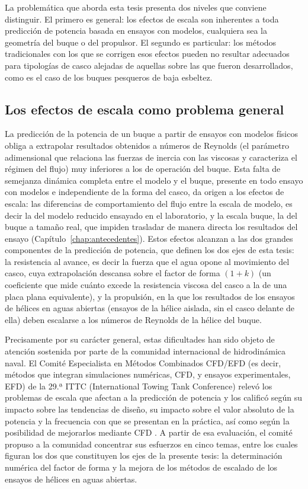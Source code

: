 La problemática que aborda esta tesis presenta dos niveles que conviene
distinguir. El primero es general: los efectos de escala son inherentes a
toda predicción de potencia basada en ensayos con modelos, cualquiera sea la
geometría del buque o del propulsor. El segundo es particular: los métodos
tradicionales con los que se corrigen esos efectos pueden no resultar
adecuados para tipologías de casco alejadas de aquellas sobre las que fueron
desarrollados, como es el caso de los buques pesqueros de baja esbeltez.

\subsection{Los efectos de escala como problema general}

La predicción de la potencia de un buque a partir de ensayos con modelos
físicos obliga a extrapolar resultados obtenidos a números de Reynolds (el
parámetro adimensional que relaciona las fuerzas de inercia con las viscosas y
caracteriza el régimen del flujo) muy inferiores a los de operación del buque.
Esta falta de semejanza dinámica completa entre el modelo y el buque, presente
en todo ensayo con modelos e independiente de la forma del casco, da origen a
los efectos de escala: las diferencias de comportamiento del flujo entre la
escala de modelo, es decir la del modelo reducido ensayado en el laboratorio,
y la escala buque, la del buque a tamaño real, que impiden trasladar de manera
directa los resultados del ensayo
(Capítulo~\ref{chap:antecedentes}). Estos efectos alcanzan a las dos grandes
componentes de la predicción de potencia, que definen los dos ejes de esta
tesis: la resistencia al avance, es decir la fuerza que el agua opone al
movimiento del casco, cuya extrapolación descansa sobre el factor de forma
$(1+k)$ (un coeficiente que mide cuánto excede la resistencia viscosa del
casco a la de una placa plana equivalente), y la propulsión, en la que los
resultados de los ensayos de hélices en aguas abiertas (ensayos de la hélice
aislada, sin el casco delante de ella) deben escalarse a los números de
Reynolds de la hélice del buque.

Precisamente por su carácter general, estas dificultades han sido objeto de
atención sostenida por parte de la comunidad internacional de hidrodinámica
naval. El Comité Especialista en Métodos Combinados CFD/EFD (es decir,
métodos que integran simulaciones numéricas, CFD, y ensayos experimentales,
EFD) de la 29.ª ITTC (International Towing Tank Conference) relevó los problemas de escala que
afectan a la predicción de potencia y los calificó según su impacto sobre las
tendencias de diseño, su impacto sobre el valor absoluto de la potencia y la
frecuencia con que se presentan en la práctica, así como según la posibilidad
de mejorarlos mediante CFD \citep{ITTC_Combined_2021}.
A partir de esa
evaluación, el comité propuso a la comunidad concentrar sus esfuerzos en cinco
temas, entre los cuales figuran los dos que constituyen los ejes de la
presente tesis: la determinación numérica del factor de forma y la mejora de
los métodos de escalado de los ensayos de hélices en aguas abiertas.

